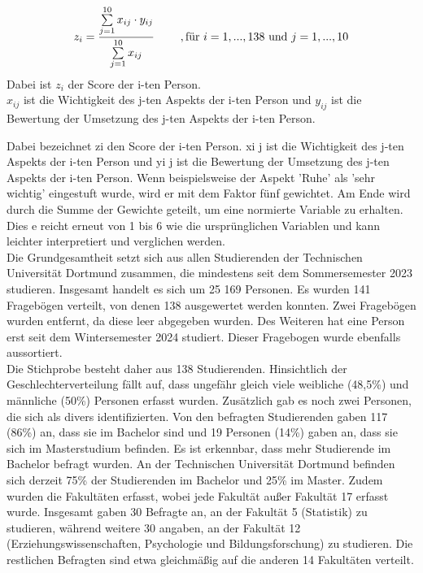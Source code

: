 \documentclass[11pt, a4paper]{article}
\begin{document}
\begin{equation*}
	z_i = \frac{\sum\limits_{j=1}^{10}x_{ij}\cdot  y_{ij}}{\sum\limits_{j=1}^{10}x_{ij}} \hspace{0.8cm} , \text{für} \ 
	i=1,...,138\  \text{und} \ j=1,...,10
\end{equation*} 
Dabei ist $z_i$ der Score der i-ten Person. \\
$x_{ij}$ ist die Wichtigkeit des j-ten Aspekts der i-ten Person und
$y_{ij}$ ist die Bewertung der Umsetzung des j-ten Aspekts der i-ten Person.


Dabei bezeichnet zi den Score der i-ten Person. xi j ist die Wichtigkeit des j-ten Aspekts der i-ten Person und yi j ist die Bewertung der Umsetzung des j-ten Aspekts der i-ten Person. Wenn beispielsweise der Aspekt 'Ruhe' als 'sehr wichtig' eingestuft wurde, wird er mit dem Faktor fünf gewichtet. Am Ende wird durch die Summe der Gewichte geteilt, um eine normierte Variable zu erhalten.  Dies
e reicht erneut von 1 bis 6 wie die ursprünglichen Variablen und kann leichter interpretiert und verglichen werden.\\


Die Grundgesamtheit setzt sich aus allen Studierenden der Technischen Universität Dortmund zusammen, die mindestens seit dem Sommersemester 2023 studieren. Insgesamt handelt es sich um 25 169 Personen. Es wurden 141 Fragebögen verteilt, von denen 138 ausgewertet werden konnten. Zwei Fragebögen wurden entfernt, da diese leer abgegeben wurden. Des Weiteren hat eine Person erst seit dem Wintersemester 2024 studiert. Dieser Fragebogen wurde ebenfalls aussortiert. \\


Die Stichprobe besteht daher aus 138 Studierenden. Hinsichtlich der Geschlechterverteilung fällt auf, dass ungefähr gleich viele weibliche (48,5\%) und männliche (50\%) Personen erfasst wurden. Zusätzlich gab es noch zwei Personen, die sich als divers identifizierten. Von den befragten Studierenden gaben 117 (86\%) an, dass sie im Bachelor sind und 19 Personen (14\%) gaben an, dass sie sich im Masterstudium befinden. Es ist erkennbar, dass mehr Studierende im Bachelor befragt wurden. An der Technischen Universität Dortmund befinden sich derzeit 75\% der Studierenden im Bachelor und 25\% im Master. Zudem wurden die Fakultäten erfasst, wobei jede Fakultät außer Fakultät 17 erfasst wurde. Insgesamt gaben 30 Befragte an, an der Fakultät 5 (Statistik) zu studieren, während weitere 30 angaben, an der Fakultät 12 (Erziehungswissenschaften, Psychologie und Bildungsforschung) zu studieren. Die restlichen Befragten sind etwa gleichmäßig auf die anderen 14 Fakultäten verteilt.
\end{document}
